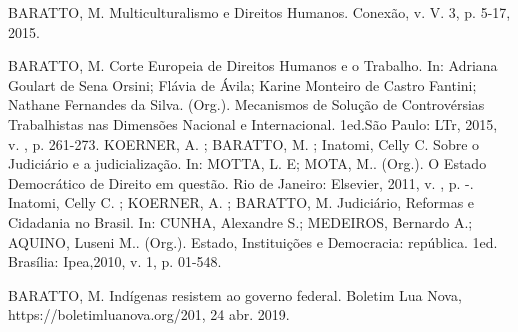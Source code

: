 

\begin{cvcitems}
  \cvcitem
    {BARATTO, M.}
    {Multiculturalismo e Direitos Humanos. Conexão, v. V. 3, p. 5-17, 2015.}
\end{cvcitems}



\begin{cvcitems}
  \cvcitem
    {BARATTO, M.}
    {Corte Europeia de Direitos Humanos e o Trabalho. In: Adriana Goulart de Sena Orsini; Flávia de Ávila; Karine Monteiro de Castro Fantini; Nathane Fernandes da Silva. (Org.). Mecanismos de Solução de Controvérsias Trabalhistas nas Dimensões Nacional e Internacional. 1ed.São Paulo: LTr, 2015, v. , p. 261-273.}
  \cvcitem
    {KOERNER, A. ; BARATTO, M. ; Inatomi, Celly C.}
    {Sobre o Judiciário e a judicialização. In: MOTTA, L. E; MOTA, M.. (Org.). O Estado Democrático de Direito em questão. Rio de Janeiro: Elsevier, 2011, v. , p. -.}
  \cvcitem
    {Inatomi, Celly C. ; KOERNER, A. ; BARATTO, M.}
    {Judiciário, Reformas e Cidadania no Brasil. In: CUNHA, Alexandre S.; MEDEIROS, Bernardo A.; AQUINO, Luseni M.. (Org.). Estado, Instituições e Democracia: república. 1ed. Brasília: Ipea,2010, v. 1, p. 01-548.}
\end{cvcitems}


\begin{cvcitems}
  \cvcitem
    {BARATTO, M.}
    {Indígenas resistem ao governo federal. Boletim Lua Nova, https://boletimluanova.org/201, 24 abr. 2019.}
\end{cvcitems}



